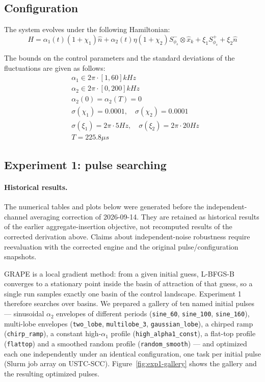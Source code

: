 \documentclass{simple-notes}
\begin{document}
\subsection{Configuration}
The system evolves under the following Hamiltonian:
\begin{equation}
    H = \alpha_1(t) (1 + \chi_1)\hat n + \alpha_2(t) \eta(1+\chi_2)S^-_{\phi_s} \otimes \hat x_k + \xi_1 S_{\phi_s}^{+} + \xi_2 \hat n 
\end{equation}

The bounds on the control parameters and the standard deviations of the fluctuations are given as follows:
\begin{align*}
    &\alpha_1\in 2\pi \cdot[1, 60] kHz \\
    &\alpha_2\in 2\pi \cdot[0, 200] kHz \\
    &\alpha_2(0) = \alpha_2(T) = 0 \\
    &\sigma(\chi_1) = 0.0001,\quad \sigma(\chi_2) = 0.0001 \\
    &\sigma(\xi_1) = 2\pi \cdot 5Hz,\quad \sigma(\xi_2) = 2\pi \cdot 20Hz\\
    & T = 225.8 \mu s
\end{align*}
\subsection{Experiment 1: pulse searching}
\paragraph{Historical results.}
The numerical tables and plots below were generated before the independent-channel
averaging correction of 2026-09-14. They are retained as historical results of
the earlier aggregate-insertion objective, not recomputed results of the corrected
derivation above. Claims about independent-noise robustness require reevaluation
with the corrected engine and the original pulse/configuration snapshots.

GRAPE is a local gradient method: from a given initial guess, L-BFGS-B converges to a stationary point inside the basin of attraction of that guess, so a single run samples exactly one basin of the control landscape. Experiment 1 therefore searches over basins. We prepared a gallery of ten named initial pulses --- sinusoidal $\alpha_2$ envelopes of different periods (\texttt{sine\_60}, \texttt{sine\_100}, \texttt{sine\_160}), multi-lobe envelopes (\texttt{two\_lobe}, \texttt{multilobe\_3}, \texttt{gaussian\_lobe}), a chirped ramp (\texttt{chirp\_ramp}), a constant high-$\alpha_1$ profile (\texttt{high\_alpha1\_const}), a flat-top profile (\texttt{flattop}) and a smoothed random profile (\texttt{random\_smooth}) --- and optimized each one independently under an identical configuration, one task per initial pulse (Slurm job array on USTC-SCC). Figure~\ref{fig:exp1-gallery} shows the gallery and the resulting optimized pulses.
\end{document}
